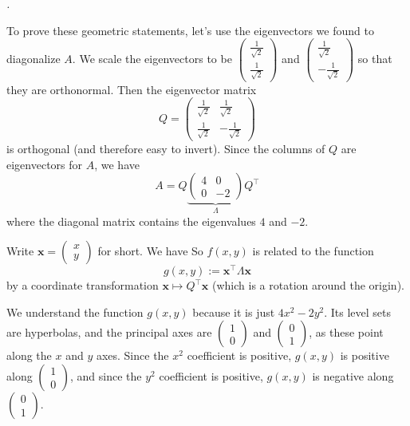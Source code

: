 \documentclass[10pt]{amsart}
\makeatletter
\renewenvironment{proof}[1][\proofname]{\par
	\pushQED{\qed}%
	\normalfont \topsep6\p@\@plus6\p@\relax
	\noindent\emph{#1.} 
	\ignorespaces
}{%
\popQED\endtrivlist\@endpefalse
}
\theoremstyle{mythm}
\theoremstyle{definition}
\theoremstyle{myrmk}
\newenvironment{myproof}{\color{myblue}\begin{proof}}{\end{proof}}
\makeatother
\begin{document}
	\begin{myproof}
		To prove these geometric statements, let's use the eigenvectors we found to diagonalize $A$. We scale the eigenvectors to be $\begin{pmatrix}
		\frac{1}{\sqrt{2}} \\ \frac{1}{\sqrt{2}}
		\end{pmatrix}$ and $\begin{pmatrix}
		\frac{1}{\sqrt{2}} \\ -\frac{1}{\sqrt{2}} 
		\end{pmatrix}$ so that they are orthonormal. Then the eigenvector matrix 
		\[
			Q = \begin{pmatrix}
			\frac{1}{\sqrt{2}} & \frac{1}{\sqrt{2}} \\ \frac{1}{\sqrt{2}} & - \frac{1}{\sqrt{2}} 
			\end{pmatrix}
		\]
		is orthogonal (and therefore easy to invert). Since the columns of $Q$ are eigenvectors for $A$, we have
		\[
			A = Q \underbrace{\begin{pmatrix}
			4 & 0 \\ 0 & -2
			\end{pmatrix}}_{\Lambda} Q^{\top}
		\]
		where the diagonal matrix contains the eigenvalues $4$ and $-2$. 
		
		Write $\bm{x} = \begin{pmatrix}
		x \\ y
		\end{pmatrix}$ for short. We have 
		So $f(x, y)$ is related to the function 
		\[
			g(x, y) := \bm{x}^\top \Lambda \bm{x}
		\]
		by a coordinate transformation $\bm{x} \mapsto Q^\top \bm{x}$ (which is a rotation around the origin). 
		
		We understand the function $g(x, y)$ because it is just $4x^2 - 2y^2$. Its level sets are hyperbolas, and the principal axes are $\begin{pmatrix}
		1 \\ 0 
		\end{pmatrix}$ and $\begin{pmatrix}
		0 \\ 1
		\end{pmatrix}$, as these point along the $x$ and $y$ axes. Since the $x^2$ coefficient is positive, $g(x, y)$ is positive along $\begin{pmatrix}
			1 \\ 0
		\end{pmatrix}$, and since the $y^2$ coefficient is positive, $g(x, y)$ is negative along $\begin{pmatrix}
		0 \\ 1
		\end{pmatrix}$. 
		

\end{myproof}
\end{document}
